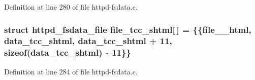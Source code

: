 Definition at line 280 of file httpd-\/fsdata.c.

\hypertarget{httpd-fsdata_8c_aff9178f8d1f6c4665e6bd22e22f4b78b}{
\subsubsection[{file\_\-tcc\_\-shtml}]{\setlength{\rightskip}{0pt plus 5cm}struct {\bf httpd\_\-fsdata\_\-file} {\bf file\_\-tcc\_\-shtml}\mbox{[}$\,$\mbox{]} = \{\{{\bf file\_\_\-html}, data\_\-tcc\_\-shtml, data\_\-tcc\_\-shtml + 11, sizeof(data\_\-tcc\_\-shtml) -\/ 11\}\}}}
\label{httpd-fsdata_8c_aff9178f8d1f6c4665e6bd22e22f4b78b}


Definition at line 284 of file httpd-\/fsdata.c.

